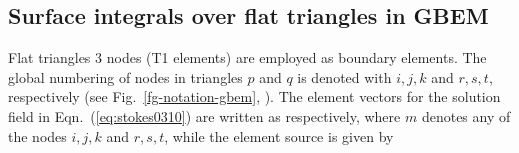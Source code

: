\documentclass[oneside,onecolumn,10pt,final]{asme2ej}
\newcounter{tema}
\begin{document}
\subsection{Surface integrals over flat triangles in GBEM}
\label{sec:surface-integrals}

\noindent
Flat triangles  3 nodes (T1 elements) are employed as 
boundary elements. The global numbering of nodes in triangles 
$p$ and $q$ is denoted with $i,j,k$ and $r,s,t$, respectively 
(see Fig.~\ref{fg-notation-gbem}, ). 
The element vectors for the solution field 
in Eqn.~(\ref{eq:stokes0310}) are written as 
%
%
respectively, where $m$ denotes any of the nodes $i,j,k$
and $r,s,t$, while the element source is given by%
%
\end{document}
